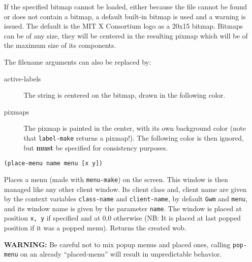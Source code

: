 If the specified bitmap cannot be loaded, either because the file cannot be
found or does not contain a bitmap, a default built-in bitmap is used and a
warning is issued. The default is the MIT X Consortium logo as a 20x15 bitmap.
Bitmaps can be of any size, they will be centered in the resulting pixmap
which will be of the maximum size of its components.

The filename arguments can also be replaced by:

\begin{description} 

\item[active-labels] The string is centered on the bitmap, drawn in the
following color.

\item[pixmaps]      The pixmap is painted in the center, with its own
background color (note that \verb"label-make" returns a pixmap!). The
following color is then ignored, but {\bf must} be specified for consistency
purposes.

\end{description}


        
{\usagefont\begin{verbatim}
(place-menu name menu [x y])
\end{verbatim}}\usageupspace

Places a menu (made with \verb"menu-make") on the screen. This window is
then managed like any other client window. Its client class and,
client name are given by the context variables \verb"class-name" and
\verb"client-name", by default \verb"Gwm" and \verb"menu", and its 
window name is given by the parameter \verb"name".  The window is
placed at position {\tt x, y} if specified and at 0,0 otherwise (NB: It is
placed at last popped position if it was a popped menu). Returns the created
wob.

{\bf WARNING:} Be careful not to mix popup menus and placed ones, calling
\verb"pop-menu" on an already ``placed-menu'' will result in unpredictable
behavior. 

